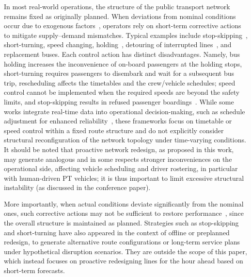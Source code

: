 \documentclass[a4paper,fleqn]{cas-sc}
\begin{document}
In most real-world operations, the structure of the public transport network remains fixed as originally planned. 
When deviations from nominal conditions occur due to exogenous factors~\citep{nissen2020does, chen2009analyzing}, 
operators rely on short-term corrective actions to mitigate supply--demand mismatches.
Typical examples include stop-skipping~\citep{peled2021quality}, short-turning, 
speed changing, holding~\citep{tang2018optimal, manasra2019optimization, gkiotsalitis2020public, olvera2023holding}, 
detouring of interrupted lines~\citep{zheng2023multi}, and replacement buses.
Each control action has distinct disadvantages.
Namely, bus holding increases the inconvenience of on-board passengers at the holding stops, short-turning requires passengers to disembark and wait for a subsequent bus trip, rescheduling affects the timetables and the crew/vehicle schedules; speed control cannot be implemented when the required speeds are beyond the safety limits, and stop-skipping results in refused passenger boardings~\citep{gkiotsalitis2021stop}.
While some works integrate real-time data into operational decision-making, such as schedule adjustment for enhanced reliability~\citep{cao2019real}, these frameworks focus on timetable or speed control within a fixed route structure and do not explicitly consider structural reconfiguration of the network topology under time-varying conditions.
It should be noted that proactive network redesign, as proposed in this work, may generate analogous and in some respects stronger inconveniences on the operational side, affecting vehicle scheduling and driver rostering, in particular with human-driven PT vehicles; it is thus important to limit excessive structural instability (as discussed in the conference paper).

More importantly, when actual conditions deviate significantly from the nominal ones, such corrective actions may not be sufficient to restore performance~\citep{guo2024restoring}, since the overall structure is maintained as planned.
%
Strategies such as stop-skipping and short-turning have also appeared in the context of offline or preplanned redesign, to generate alternative route configurations or long-term service plans under hypothetical disruption scenarios. They are outside the scope of this paper, which instead focuses on proactive redesigning lines for the hour ahead based on short-term forecasts.
\end{document}
